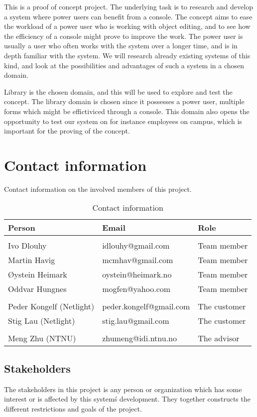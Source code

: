 This is a proof of concept project. The underlying task is to research and develop a system where power users can benefit from a console.  The concept aims to ease the workload of a power user who is working with object editing, and to see how the efficiency of a console might prove to improve the work. The power user is usually a user who often works with the system over a longer time, and is in depth familiar with the system. We will research already existing systems of this kind, and look at the possibilities and advantages of such a system in a chosen domain.

Library is the chosen domain, and this will be used to explore and test the concept. The library domain is chosen since it possesses a power user, multiple forms which might be effictiviced through a console. This domain also opens the opportunity to test our system on for instance employees on campus, which is important for the proving of the concept.


\section{Contact information}
Contact information on the involved members of this project.
\begin{table}
\centering
\caption{Contact information}
\begin{tabular}{ l  l  l  }
 \textbf{Person} & \textbf{Email} & \textbf{Role} \\ 
\hline \\[-2.0ex]
 Ivo Dlouhy & idlouhy@gmail.com & Team member \\
 Martin Havig & mcmhav@gmail.com & Team member \\
 Øystein Heimark & oystein@heimark.no & Team member \\
 Oddvar Hungnes & mogfen@yahoo.com & Team member \\ 
\hline \\[-2.0ex]
 Peder Kongelf (Netlight) & peder.kongelf@gmail.com & The customer \\
 Stig Lau (Netlight) & stig.lau@gmail.com & The customer \\ 
\hline \\[-2.0ex]
  Meng Zhu (NTNU) & zhumeng@idi.ntnu.no & The advisor \\ 
\hline
\end{tabular}
\end{table}

\subsection{Stakeholders}
The stakeholders in this project is any person or organization which has some interest or is affected by this system\'s development. They together constructs the different restrictions and goals of the project.

